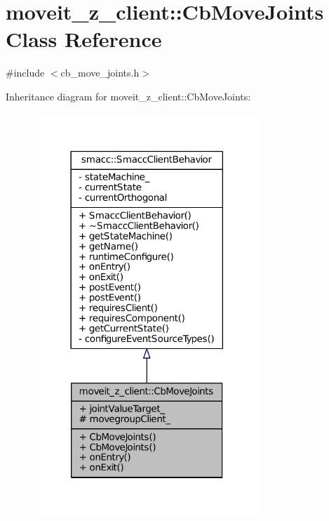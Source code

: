 \hypertarget{classmoveit__z__client_1_1CbMoveJoints}{}\section{moveit\+\_\+z\+\_\+client\+:\+:Cb\+Move\+Joints Class Reference}
\label{classmoveit__z__client_1_1CbMoveJoints}


{\ttfamily \#include $<$cb\+\_\+move\+\_\+joints.\+h$>$}



Inheritance diagram for moveit\+\_\+z\+\_\+client\+:\+:Cb\+Move\+Joints\+:
\nopagebreak
\begin{figure}[H]
\begin{center}
\leavevmode
\includegraphics[width=242pt]{classmoveit__z__client_1_1CbMoveJoints__inherit__graph}
\end{center}
\end{figure}


